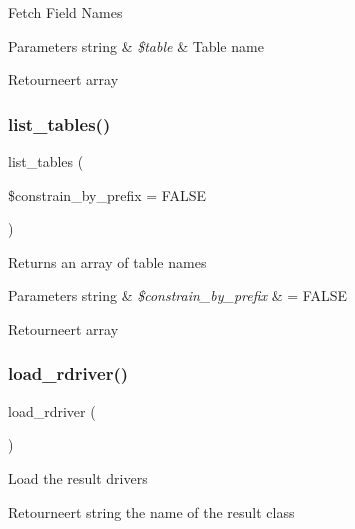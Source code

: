 Fetch Field Names


\begin{DoxyParams}[1]{Parameters}
string & {\em \$table} & Table name \\
\hline
\end{DoxyParams}
\begin{DoxyReturn}{Retourneert}
array 
\end{DoxyReturn}
\mbox{\label{class_c_i___d_b__driver_accef90659bed312aba1c3df80620b402}} 
\subsubsection{\texorpdfstring{list\_tables()}{list\_tables()}}
{\footnotesize\ttfamily list\+\_\+tables (\begin{DoxyParamCaption}\item[{}]{\$constrain\+\_\+by\+\_\+prefix = {\ttfamily FALSE} }\end{DoxyParamCaption})}

Returns an array of table names


\begin{DoxyParams}[1]{Parameters}
string & {\em \$constrain\+\_\+by\+\_\+prefix} & = F\+A\+L\+SE \\
\hline
\end{DoxyParams}
\begin{DoxyReturn}{Retourneert}
array 
\end{DoxyReturn}
\mbox{\label{class_c_i___d_b__driver_a0bd509a0088f09f4bbfbcbbe78bc3547}} 
\subsubsection{\texorpdfstring{load\_rdriver()}{load\_rdriver()}}
{\footnotesize\ttfamily load\+\_\+rdriver (\begin{DoxyParamCaption}{ }\end{DoxyParamCaption})}

Load the result drivers

\begin{DoxyReturn}{Retourneert}
string the name of the result class 
\end{DoxyReturn}
\mbox{\label{class_c_i___d_b__driver_ad69bddb2ba31b27415484b3da4213ba8}} 
